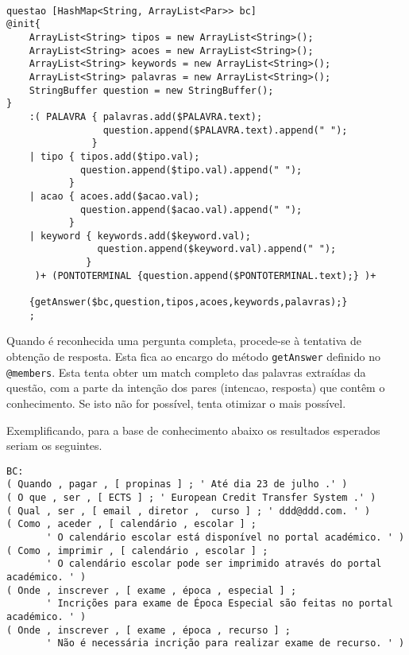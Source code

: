 \begin{verbatim}

questao [HashMap<String, ArrayList<Par>> bc]
@init{
    ArrayList<String> tipos = new ArrayList<String>();
    ArrayList<String> acoes = new ArrayList<String>();
    ArrayList<String> keywords = new ArrayList<String>();
    ArrayList<String> palavras = new ArrayList<String>();
    StringBuffer question = new StringBuffer();
}
    :( PALAVRA { palavras.add($PALAVRA.text);
                 question.append($PALAVRA.text).append(" ");
               } 
    | tipo { tipos.add($tipo.val); 
             question.append($tipo.val).append(" ");
           } 
    | acao { acoes.add($acao.val); 
             question.append($acao.val).append(" ");
           } 
    | keyword { keywords.add($keyword.val); 
                question.append($keyword.val).append(" ");
              } 
     )+ (PONTOTERMINAL {question.append($PONTOTERMINAL.text);} )+
     
    {getAnswer($bc,question,tipos,acoes,keywords,palavras);}
    ;
\end{verbatim}

Quando é reconhecida uma pergunta completa, procede-se à tentativa de obtenção de resposta. Esta fica ao encargo do método \texttt{getAnswer} definido no \texttt{@members}. Esta tenta obter um match completo das palavras extraídas da questão, com a parte da intenção dos pares (intencao, resposta) que contêm o conhecimento. Se isto não for possível, tenta otimizar o mais possível.

Exemplificando, para a base de conhecimento abaixo os resultados esperados seriam os seguintes.

\begin{verbatim}
BC:
( Quando , pagar , [ propinas ] ; ' Até dia 23 de julho .' )
( O que , ser , [ ECTS ] ; ' European Credit Transfer System .' )
( Qual , ser , [ email , diretor ,  curso ] ; ' ddd@ddd.com. ' )
( Como , aceder , [ calendário , escolar ] ; 
       ' O calendário escolar está disponível no portal académico. ' )
( Como , imprimir , [ calendário , escolar ] ; 
       ' O calendário escolar pode ser imprimido através do portal académico. ' )
( Onde , inscrever , [ exame , época , especial ] ; 
       ' Incrições para exame de Época Especial são feitas no portal académico. ' )
( Onde , inscrever , [ exame , época , recurso ] ; 
       ' Não é necessária incrição para realizar exame de recurso. ' )

\end{verbatim}

